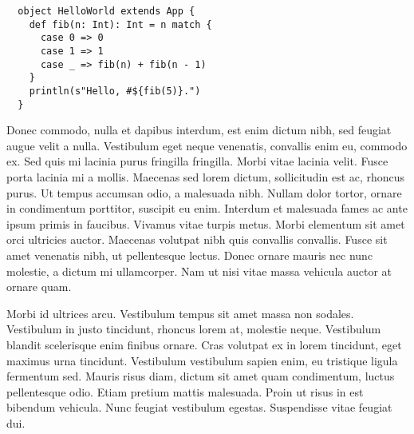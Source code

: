 \documentclass[11pt]{awe-homework}
\begin{document}
\makeheader


\begin{verbatim}
  object HelloWorld extends App {
    def fib(n: Int): Int = n match {
      case 0 => 0
      case 1 => 1
      case _ => fib(n) + fib(n - 1)
    }
    println(s"Hello, #${fib(5)}.")
  }
\end{verbatim}


Donec commodo, nulla et dapibus interdum, est enim dictum nibh, sed feugiat augue velit a nulla. Vestibulum eget neque venenatis, convallis enim eu, commodo ex. Sed quis mi lacinia purus fringilla fringilla. Morbi vitae lacinia velit. Fusce porta lacinia mi a mollis. Maecenas sed lorem dictum, sollicitudin est ac, rhoncus purus. Ut tempus accumsan odio, a malesuada nibh. Nullam dolor tortor, ornare in condimentum porttitor, suscipit eu enim. Interdum et malesuada fames ac ante ipsum primis in faucibus. Vivamus vitae turpis metus. Morbi elementum sit amet orci ultricies auctor. Maecenas volutpat nibh quis convallis convallis. Fusce sit amet venenatis nibh, ut pellentesque lectus. Donec ornare mauris nec nunc molestie, a dictum mi ullamcorper. Nam ut nisi vitae massa vehicula auctor at ornare quam.

Morbi id ultrices arcu. Vestibulum tempus sit amet massa non sodales. Vestibulum in justo tincidunt, rhoncus lorem at, molestie neque. Vestibulum blandit scelerisque enim finibus ornare. Cras volutpat ex in lorem tincidunt, eget maximus urna tincidunt. Vestibulum vestibulum sapien enim, eu tristique ligula fermentum sed. Mauris risus diam, dictum sit amet quam condimentum, luctus pellentesque odio. Etiam pretium mattis malesuada. Proin ut risus in est bibendum vehicula. Nunc feugiat vestibulum egestas. Suspendisse vitae feugiat dui.
\end{document}
